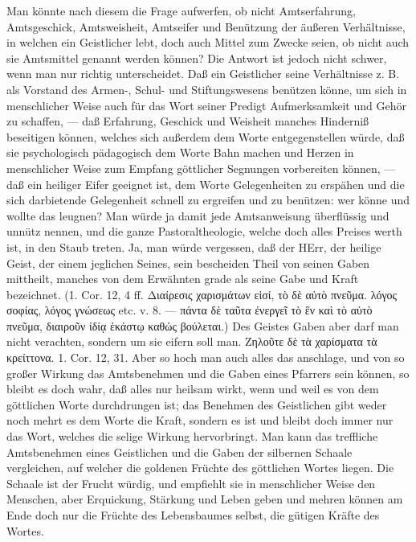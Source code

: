 Man könnte nach diesem die Frage aufwerfen, ob nicht Amtserfahrung, Amtsgeschick, Amtsweisheit, Amtseifer und Benützung der äußeren Verhältnisse, in welchen ein Geistlicher lebt, doch auch Mittel zum Zwecke seien, ob nicht auch sie Amtsmittel genannt werden können? Die Antwort ist jedoch nicht schwer, wenn man nur richtig unterscheidet. Daß ein Geistlicher seine Verhältnisse z. B. als Vorstand des Armen-, Schul- und Stiftungswesens benützen könne, um sich in menschlicher Weise auch für das Wort
seiner Predigt Aufmerksamkeit und Gehör zu schaffen, — daß Erfahrung, Geschick und Weisheit manches Hinderniß beseitigen können, welches sich außerdem dem Worte entgegenstellen würde, daß sie psychologisch pädagogisch dem Worte Bahn machen und Herzen in menschlicher Weise zum Empfang göttlicher Segnungen vorbereiten können, — daß ein heiliger Eifer geeignet ist, dem Worte Gelegenheiten zu erspähen und die sich darbietende Gelegenheit schnell zu ergreifen und zu benützen: wer könne und wollte das leugnen? Man würde ja damit jede Amtsanweisung überflüssig und unnütz nennen, und die ganze Pastoraltheologie, welche doch alles Preises werth ist, in den Staub treten. Ja, man würde vergessen, daß der HErr, der heilige Geist, der einem jeglichen Seines, sein bescheiden Theil von seinen Gaben mittheilt, manches von dem Erwähnten grade als seine Gabe und Kraft bezeichnet. (1. Cor. 12, 4 ff. Διαίρεσις χαρισμάτων εἰσί, τὸ δὲ αὐτὸ πνεῦμα. λόγος σοφίας, λόγος γνώσεως etc. v. 8. — πάντα δὲ ταῦτα ἐνεργεῖ τὸ ἓν καὶ τὸ αὐτὸ πνεῦμα, διαιροῦν ἰδίᾳ ἑκάστῳ καθώς βούλεται.) Des Geistes Gaben aber darf man nicht verachten, sondern um sie eifern soll man. Ζηλοῦτε δὲ τὰ χαρίσματα τὰ κρείττονα. 1. Cor. 12, 31. Aber so hoch man auch alles das anschlage, und von so großer Wirkung das Amtsbenehmen und die Gaben eines Pfarrers sein können, so bleibt es doch wahr, daß alles nur heilsam wirkt, wenn und weil es von dem göttlichen Worte durchdrungen ist; das Benehmen des Geistlichen gibt weder noch mehrt es dem Worte die Kraft, sondern es ist und bleibt doch immer nur
das Wort, welches die selige Wirkung hervorbringt. Man kann das treffliche Amtsbenehmen eines Geistlichen und die Gaben der silbernen Schaale vergleichen, auf welcher die goldenen Früchte des göttlichen Wortes liegen. Die Schaale ist der Frucht würdig, und empfiehlt sie in menschlicher Weise den Menschen, aber Erquickung, Stärkung und Leben geben und mehren können am Ende doch nur die Früchte des Lebensbaumes selbst, die gütigen Kräfte des Wortes.

